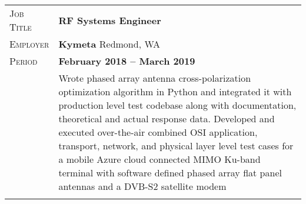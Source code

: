 \documentclass[a4paper, oneside, final]{scrartcl}
\newcommand{\gray}{\rowcolor[gray]{.90}} %
\begin{document}
\begin{center}
\begin{tabularx}{0.97\linewidth}{>{\raggedleft\scshape}p{2cm}X}
\gray Job Title & \textbf{RF Systems Engineer}\\
\gray Employer & \textbf{Kymeta} \hfill Redmond, WA\\
\gray Period & \textbf{February 2018 -- March 2019}\\
&
\vspace{-0.15 cm}
Wrote phased array antenna cross-polarization optimization algorithm in Python and integrated it with production level test codebase along with documentation, theoretical and actual response data.
\newline
\newline
Developed and executed over-the-air combined OSI application, transport, network, and physical layer level test cases for a mobile Azure cloud connected MIMO Ku-band terminal with software defined phased array flat panel antennas and a DVB-S2 satellite modem
\\
\\
\end{tabularx}



\end{center}
\end{document}
